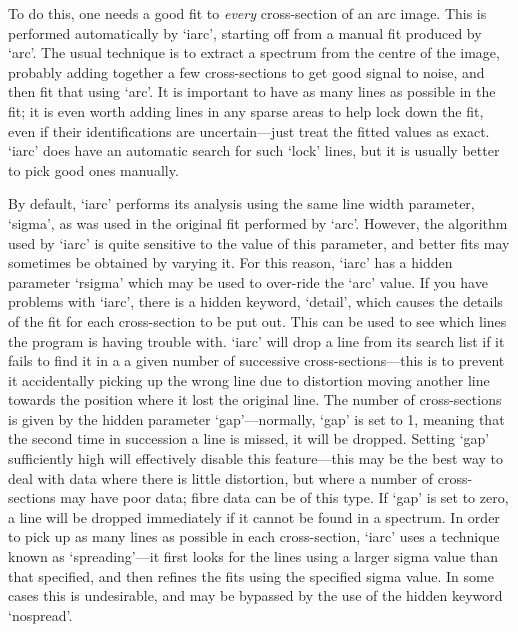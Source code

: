 \documentclass[11pt,twoside]{article}
\newcommand{\latorhtm}[2]{#1}
\newcommand{\latorhtm}[2]{#2}
\begin{document}
   To do this, one needs a good fit to {\em every\/}
   cross-section of an arc image.  This is performed automatically by
   `iarc', starting off from a manual fit produced by `arc'.  The usual
   technique is to extract a spectrum from the centre of the image,
   probably adding together a few cross-sections to get good signal to
   noise, and then fit that using `arc'.  It is important to have as
   many lines as possible in the fit; it is even worth adding lines in
   any sparse areas to help lock down the fit, even if their
   identifications are uncertain\latorhtm{---}{-}just treat the fitted
   values as
   exact.  `iarc' does have an automatic search for such `lock' lines,
   but it is usually better to pick good ones manually.

   By default, `iarc' performs its analysis using the same line width
   parameter, `sigma', as was used in the original fit performed by
   `arc'. However, the algorithm used by `iarc' is quite sensitive to
   the value of this parameter, and better fits may sometimes be
   obtained by varying it.  For this reason, `iarc' has a hidden
   parameter `rsigma' which may be used to over-ride the `arc' value.
   If you have problems with `iarc', there is a hidden keyword,
   `detail', which causes the details of the fit for each cross-section
   to be put out.  This can be used to see which lines the program is
   having trouble with.  `iarc' will drop a line from its search list if
   it fails to find it in a a given number of successive
   cross-sections\latorhtm{---}{-}this is to prevent it accidentally picking
   up the wrong line due to
   distortion moving another line towards the position where it lost the
   original line.  The number of cross-sections is given by the hidden
   parameter `gap'\latorhtm{---}{-}normally, `gap' is set to 1, meaning that
   the second time in succession a line is missed, it will be dropped.
   Setting `gap' sufficiently high will effectively disable this
   feature\latorhtm{---}{-}this may be the best way to deal with data
   where there is little
   distortion, but where a number of cross-sections may have poor data;
   fibre data can be of this type. If `gap' is set to zero, a line will
   be dropped immediately if it cannot be found in a spectrum. In order
   to pick up as many lines as possible in each cross-section, `iarc'
   uses a technique known as `spreading'\latorhtm{---}{-}it first looks for
   the lines
   using a larger sigma value than that specified, and then refines the
   fits using the specified sigma value.  In some cases this is
   undesirable, and may be bypassed by the use of the hidden keyword
   `nospread'.
\end{document}
